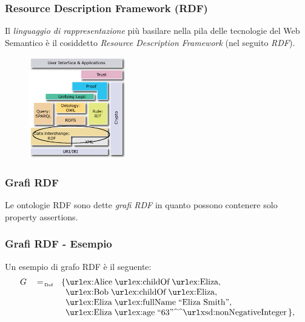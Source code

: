 \documentclass[8pt]{beamer}
\begin{document}
\begin{frame}
 \frametitle{Resource Description Framework (RDF)}
 Il \emph{linguaggio di rappresentazione} pi\`u basilare nella pila
 delle tecnologie del Web Semantico \`e il cosiddetto 
 \emph{Resource Description Framework} (nel seguito \emph{RDF}).
 
  \begin{figure}
  \includegraphics[width=160px]{Semantic_Web_Stack_RDF.png}
 \end{figure}
\end{frame}

\newcommand{\RDFv}{\mathtt{RDF}}

\begin{frame}
 \frametitle{Grafi RDF}
 Le ontologie RDF sono dette \emph{grafi RDF} in quanto possono contenere solo
 property assertions.
 \vspace{\baselineskip}
 

\end{frame}

\newcommand{\triple}[3]{\mathurl{#1}\;\mathurl{#2}\;#3}
\newcommand{\tripleO}[3]{\mathurl{#1}\;\mathurl{#2}\;\mathurl{#3}}

\begin{frame}
 \frametitle{Grafi RDF - Esempio}
 Un esempio di grafo RDF \`e il seguente:
 \[
 \begin{array}{rcl}
  G & \defAs & \{ \tripleO{ex:Alice}{ex:childOf}{ex:Eliza},\\
  &&\phantom{\{} \tripleO{ex:Bob}{ex:childOf}{ex:Eliza},\\
  &&\phantom{\{} \triple{ex:Eliza}{ex:fullName}{\stringLiteral{Eliza Smith}},\\
  &&\phantom{\{} \triple{ex:Eliza}{ex:age}{\literal{63}{xsd:nonNegativeInteger}} \,\},\\
 \end{array}
\]
\end{frame}
\end{document}
